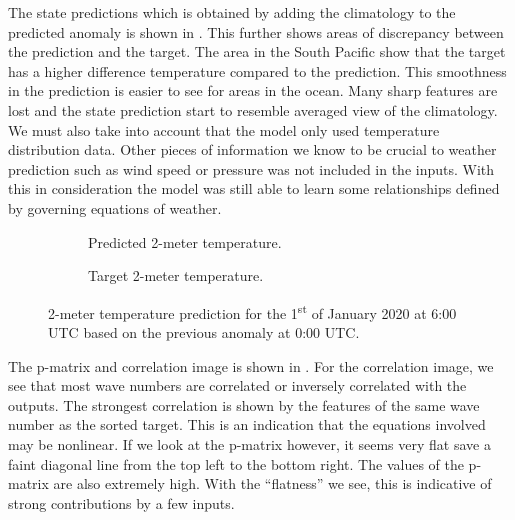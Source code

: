The state predictions which is obtained by adding the climatology to the predicted anomaly is shown in . This further shows areas of discrepancy between the prediction and the target. The area in the South Pacific show that the target has a higher difference temperature compared to the prediction. This smoothness in the prediction is easier to see for areas in the ocean. Many sharp features are lost and the state prediction start to resemble averaged view of the climatology. We must also take into account that the model only used temperature distribution data. Other pieces of information we know to be crucial to weather prediction such as wind speed or pressure was not included in the inputs. With this in consideration the model was still able to learn some relationships defined by governing equations of weather. %
\begin{figure}[H]
  \centering
  \begin{subfigure}{\linewidth}
    \begin{adjustbox}{width=\linewidth}
      
    \end{adjustbox}
    \caption{Predicted 2-meter temperature.}\label{fig:sc3_state_pred}
  \end{subfigure}
  \begin{subfigure}{\linewidth}
    \begin{adjustbox}{width=\linewidth}
      
    \end{adjustbox}
    \caption{Target 2-meter temperature.}\label{fig:sc3_state_target}
  \end{subfigure}
  \caption{2-meter temperature prediction for the 1\textsuperscript{st} of January 2020 at 6:00 UTC based on the previous anomaly at 0:00 UTC.}\label{fig:sc3_state_predictions}
\end{figure}

The p-matrix and correlation image is shown in . For the correlation image, we see that most wave numbers are correlated or inversely correlated with the outputs. The strongest correlation is shown by the features of the same wave number as the sorted target. This is an indication that the equations involved may be nonlinear. If we look at the p-matrix however, it seems very flat save a faint diagonal line from the top left to the bottom right. The values of the p-matrix are also extremely high. With the \enquote{flatness} we see, this is indicative of strong contributions by a few inputs.

